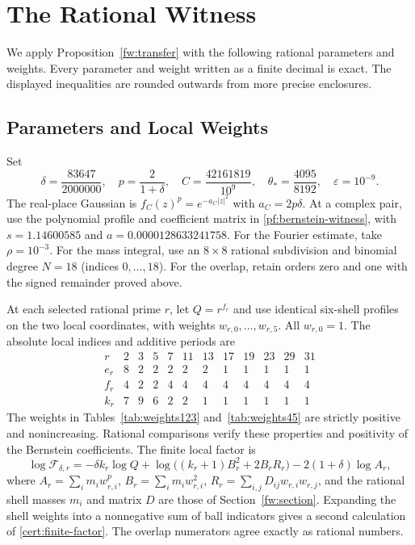\section{The Rational Witness}
\label{sec:certificate}

We apply Proposition~\ref{fw:transfer} with the following rational
parameters and weights. Every parameter and weight written as a finite
decimal is exact. The displayed inequalities are rounded outwards from
more precise enclosures.

\subsection{Parameters and Local Weights}
Set
\[
 \delta=\frac{83647}{2000000},\quad p=\frac2{1+\delta},\quad
 C=\frac{42161819}{10^9},\quad
 \theta_* =\frac{4095}{8192},\quad \varepsilon=10^{-9}.
\]
The real-place Gaussian is $f_C(z)^p=e^{-a_C|z|^2}$ with $a_C=2p\delta$.
At a complex pair, use the polynomial profile and coefficient matrix in
\eqref{pf:bernstein-witness}, with $s=1.14600585$ and
$a=0.0000128633241758$. For the Fourier estimate, take $\rho=10^{-3}$.
For the mass integral, use an $8\times8$ rational subdivision and
binomial degree $N=18$ (indices $0,\ldots,18$). For the overlap, retain
orders zero and one with the signed remainder proved above.

At each selected rational prime $r$, let $Q=r^{f_r}$ and use identical
six-shell profiles on the two local coordinates, with weights
$w_{r,0},\ldots,w_{r,5}$. All $w_{r,0}=1$. The absolute local indices
and additive periods are
\[
\begin{array}{c|rrrrrrrrrrr}
r&2&3&5&7&11&13&17&19&23&29&31\\\hline
e_r&8&2&2&2&2&2&1&1&1&1&1\\
f_r&4&2&2&4&4&4&4&4&4&4&4\\
k_r&7&9&6&2&2&1&1&1&1&1&1
\end{array}
\]
The weights in Tables~\ref{tab:weights123} and~\ref{tab:weights45} are
strictly positive and nonincreasing. Rational comparisons verify these
properties and positivity of the Bernstein coefficients. The finite
local factor is
\begin{equation}\label{cert:finite-factor}
 \log\mathcal F_{\delta,r}
 =-\delta k_r\log Q+
 \log\big((k_r+1)B_r^2+2B_rR_r\big)-2(1+\delta)\log A_r,
\end{equation}
where $A_r=\sum_i m_iw_{r,i}^p$, $B_r=\sum_i m_iw_{r,i}^2$,
$R_r=\sum_{i,j}D_{ij}w_{r,i}w_{r,j}$, and the rational shell masses
$m_i$ and matrix $D$ are those of Section~\ref{fw:section}.
Expanding the shell weights into a nonnegative sum of ball indicators
gives a second calculation of \eqref{cert:finite-factor}. The overlap
numerators agree exactly as rational numbers.

